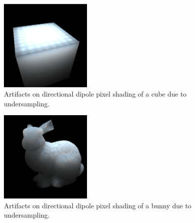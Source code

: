 \documentclass[12pt, twoside,a4paper, landscape]{article}
\begin{document}
\clearpage
\begin{figure}[here]
\centering
\includegraphics[width=0.4\textwidth]{artifacts}
\caption{Artifacts on directional dipole pixel shading of a cube due to undersampling.}
\end{figure}

\begin{figure}[here]
\centering
\includegraphics[width=0.4\textwidth]{artifacts_bunny}
\caption{Artifacts on directional dipole pixel shading of a bunny due to undersampling.}
\end{figure}
\end{document}
